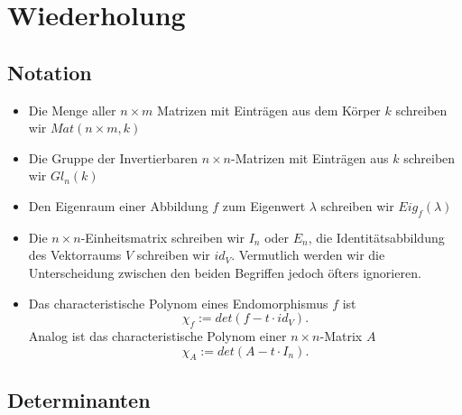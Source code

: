 \documentclass{report}
\begin{document}
\newtheorem{lemma}{Lemma}[chapter]
\newtheorem{theorem}[lemma]{Satz}
\newtheorem{proposition}[lemma]{Proposition}
\newtheorem{corollary}[lemma]{Korollar}



\theoremstyle{definition}
\newtheorem{definition}[lemma]{Definition}
\newtheorem{beispiel}[lemma]{Beispiel}
\newtheorem{beobachtung}[lemma]{Beobachtung}
\newtheorem{anmerkung}[lemma]{Anmerkung}
\newtheorem{question}[lemma]{Frage}
\newtheorem{application}[lemma]{Anwendung}
\newtheorem{konsequenz}[lemma]{Konsequenz}
%
%
%

\tableofcontents
\thispagestyle{fancy}
%
%
%
\chapter{Wiederholung}
\section{Notation}
\begin{itemize}
 \item Die Menge aller $n \times m$ Matrizen mit Einträgen aus dem Körper $k$ schreiben wir $Mat(n \times m, k)$
 \item Die Gruppe der Invertierbaren $n \times n$-Matrizen mit Einträgen aus $k$ schreiben wir $Gl_n(k)$
 \item Den Eigenraum einer Abbildung $f$ zum Eigenwert $\lambda$ schreiben wir $Eig_f(\lambda)$
 \item Die $n \times n$-Einheitsmatrix schreiben wir $I_n$ oder $E_n$, die Identitätsabbildung des Vektorraums $V$ schreiben wir $id_V$. Vermutlich werden wir die Unterscheidung zwischen den beiden Begriffen jedoch öfters ignorieren.
 \item Das characteristische Polynom eines Endomorphismus $f$ ist
 \begin{equation}
  \chi_f := det(f - t \cdot id_V).
 \end{equation}
 Analog ist das characteristische Polynom einer $n \times n$-Matrix $A$
 \begin{equation}
  \chi_A := det(A - t \cdot I_n).
 \end{equation}
\end{itemize}
%
%
\section{Determinanten}
\end{document}
